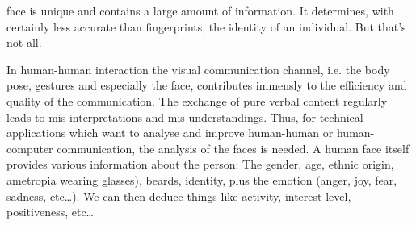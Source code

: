  face is unique and contains a large amount of
information. It determines, with certainly less accurate than
fingerprints, the identity of an individual. But that’s not all.

 In human-human interaction the visual communication channel, i.e. the body pose, gestures and especially the face, contributes immensly to the efficiency and quality of the communication. The exchange of pure verbal content  regularly leads to mis-interpretations and mis-understandings. Thus, for technical applications which want to analyse and improve human-human or human-computer communication, the analysis of the faces is needed. A human face itself provides various information about the person: The gender, age, ethnic origin, ametropia wearing glasses), beards, identity, plus the emotion (anger, joy, fear, sadness, etc\dots ). We can then deduce things like activity, interest level, positiveness, etc\dots
